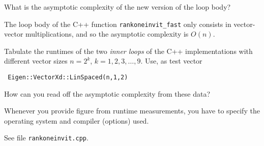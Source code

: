 \begin{problem}
\begin{subproblem}[1]
 What is the asymptotic complexity of the new version of the loop body?
  \begin{solution}
The loop body of the C++ function \texttt{rankoneinvit\_fast} only consists in vector-vector multiplications, and so the asymptotic complexity is $O(n)$.
     \end{solution}
\end{subproblem}

\begin{subproblem}[2]
Tabulate the runtimes of the two \emph{inner loops} of the C++ implementations with different vector sizes
{$n=2^{k}$}, {$k=1,2,3,\ldots,9$}. Use, as test vector
\begin{verbatim}
 Eigen::VectorXd::LinSpaced(n,1,2)
\end{verbatim}
How can you read off the asymptotic
complexity from these data?

\begin{hint}
  Whenever you provide figure from runtime measurements, you have to specify
  the operating system and compiler (options) used. 
\end{hint}

\begin{solution}
  See file \texttt{rankoneinvit.cpp}.
\end{solution}
\end{subproblem}
\end{problem}
